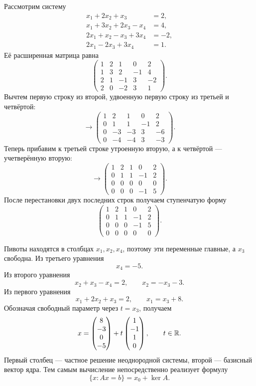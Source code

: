 Рассмотрим систему
\[
\begin{aligned}
x_1+2x_2+x_3&=2,\\
x_1+3x_2+2x_3-x_4&=4,\\
2x_1+x_2-x_3+3x_4&=-2,\\
2x_1-2x_3+3x_4&=1.
\end{aligned}
\]
Её расширенная матрица равна
\[
\left(
\begin{array}{rrrr|r}
1&2&1&0&2\\
1&3&2&-1&4\\
2&1&-1&3&-2\\
2&0&-2&3&1
\end{array}
\right).
\]
Вычтем первую строку из второй, удвоенную первую строку из третьей и четвёртой:
\[
\longrightarrow
\left(
\begin{array}{rrrr|r}
1&2&1&0&2\\
0&1&1&-1&2\\
0&-3&-3&3&-6\\
0&-4&-4&3&-3
\end{array}
\right).
\]
Теперь прибавим к третьей строке утроенную вторую, а к четвёртой --- учетверённую вторую:
\[
\longrightarrow
\left(
\begin{array}{rrrr|r}
1&2&1&0&2\\
0&1&1&-1&2\\
0&0&0&0&0\\
0&0&0&-1&5
\end{array}
\right).
\]
После перестановки двух последних строк получаем ступенчатую форму
\[
\left(
\begin{array}{rrrr|r}
1&2&1&0&2\\
0&1&1&-1&2\\
0&0&0&-1&5\\
0&0&0&0&0
\end{array}
\right).
\]

Пивоты находятся в столбцах \(x_1,x_2,x_4\), поэтому эти переменные главные, а \(x_3\) свободна. Из третьего уравнения
\[
x_4=-5.
\]
Из второго уравнения
\[
x_2+x_3-x_4=2,
\qquad
x_2=-x_3-3.
\]
Из первого уравнения
\[
x_1+2x_2+x_3=2,
\qquad
x_1=x_3+8.
\]
Обозначая свободный параметр через \(t=x_3\), получаем
\[
x=
\begin{pmatrix}
8\\-3\\0\\-5
\end{pmatrix}
+
t
\begin{pmatrix}
1\\-1\\1\\0
\end{pmatrix},
\qquad t\in\mathbb{R}.
\]
Первый столбец --- частное решение неоднородной системы, второй --- базисный вектор ядра. Тем самым вычисление непосредственно реализует формулу
\[
\{x:Ax=b\}=x_0+\ker A.
\]

